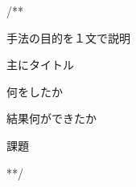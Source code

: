 \documentclass[a4paper, twocolumn, 10pt]{jarticle}
\makeatletter
\def\section{%
	\@startsection{section}{1}{\z@}%
	{.1\Cvs \@plus.1\Cdp \@minus.1\Cdp}%
	{.1\Cvs \@plus.1\Cdp}%
	{\normalfont\normalsize\bfseries}%
}
\makeatother
\begin{document}
/**

手法の目的を１文で説明

主にタイトル

何をしたか

結果何ができたか

課題

**/











{\footnotesize }
\end{document}
